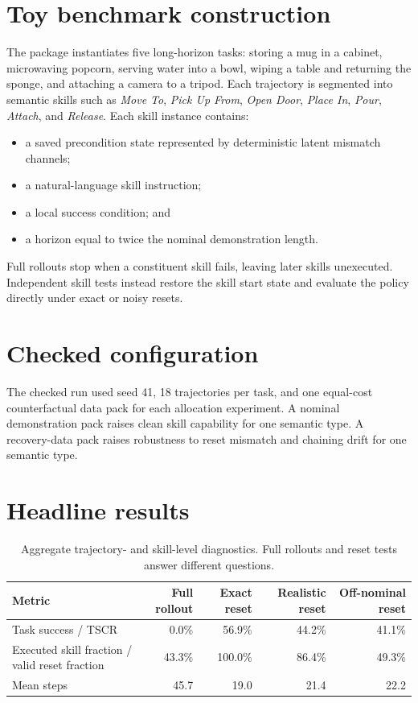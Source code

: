 \documentclass[11pt]{article}
\begin{document}
\section{Toy benchmark construction}
The package instantiates five long-horizon tasks: storing a mug in a cabinet, microwaving popcorn, serving water into a bowl, wiping a table and returning the sponge, and attaching a camera to a tripod. Each trajectory is segmented into semantic skills such as \emph{Move To}, \emph{Pick Up From}, \emph{Open Door}, \emph{Place In}, \emph{Pour}, \emph{Attach}, and \emph{Release}. Each skill instance contains:
\begin{itemize}[leftmargin=1.5em]
  \item a saved precondition state represented by deterministic latent mismatch channels;
  \item a natural-language skill instruction;
  \item a local success condition; and
  \item a horizon equal to twice the nominal demonstration length.
\end{itemize}
Full rollouts stop when a constituent skill fails, leaving later skills unexecuted. Independent skill tests instead restore the skill start state and evaluate the policy directly under exact or noisy resets.

\section{Checked configuration}
The checked run used seed 41, 18 trajectories per task, and one equal-cost counterfactual data pack for each allocation experiment. A nominal demonstration pack raises clean skill capability for one semantic type. A recovery-data pack raises robustness to reset mismatch and chaining drift for one semantic type.

\section{Headline results}
\begin{table}[H]
\centering
\begin{tabular}{lrrrr}
\toprule
Metric & Full rollout & Exact reset & Realistic reset & Off-nominal reset \\
\midrule
Task success / TSCR & 0.0\% & 56.9\% & 44.2\% & 41.1\% \\
Executed skill fraction / valid reset fraction & 43.3\% & 100.0\% & 86.4\% & 49.3\% \\
Mean steps & 45.7 & 19.0 & 21.4 & 22.2 \\
\bottomrule
\end{tabular}
\caption{Aggregate trajectory- and skill-level diagnostics. Full rollouts and reset tests answer different questions.}
\end{table}
\end{document}
